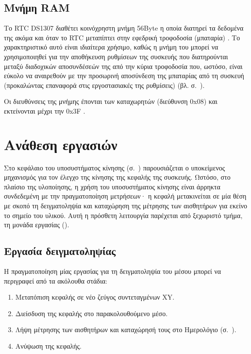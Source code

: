 \subsection{Μνήμη RAM}
\label{subsec:rtc:user-ram}

Το RTC DS1307 διαθέτει κοινόχρηστη μνήμη 56Byte η οποία διατηρεί τα δεδομένα της
ακόμα και όταν το RTC μεταπίπτει στην εφεδρική τροφοδοσία (μπαταρία)
\parencite[1]{ds1307}. Το χαρακτηριστικό αυτό είναι ιδιαίτερα χρήσιμο, καθώς η
μνήμη του μπορεί να χρησιμοποιηθεί για την αποθήκευση ρυθμίσεων της συσκευής που
διατηρούνται μεταξύ διαδοχικών αποσυνδέσεών της από την κύρια τροφοδοσία που,
ωστόσο, είναι εύκολο να αναιρεθούν με την προσωρινή αποσύνδεση της μπαταρίας από
τη συσκευή (προκαλώντας επαναφορά στις εργοστασιακές της ρυθμίσεις) (βλ.
 σ.~\pageref{subsec:backup-memory}).

Οι διευθύνσεις της μνήμης έπονται των καταχωρητών (διεύθυνση 0x08) και
εκτείνονται μέχρι την 0x3F \parencite[8]{ds1307}.



\section{Ανάθεση εργασιών}
\label{sec:task}

Στο κεφάλαιο του υποσυστήματος κίνησης (σ.~\pageref{ch:motor})
παρουσιάζεται ο υποκείμενος μηχανισμός για τον έλεγχο της κίνησης της κεφαλής
της συσκευής.
Ωστόσο, στο πλαίσιο της υλοποίησης, η χρήση του υποσυστήματος κίνησης είναι
άρρηκτα συνδεδεμένη με την πραγματοποίηση μετρήσεων· η κεφαλή μετακινείται σε
μία
θέση με σκοπό τη δειγματοληψία και καταχώρηση της μέτρησης των αισθητήρων για
εκείνο το σημείο του υλικού. Αυτή η πρόσθετη λειτουργία παρέχεται από ξεχωριστό
τμήμα, τη μονάδα εργασίας ().


\subsection{Εργασία δειγματοληψίας}

Η πραγματοποίηση μίας εργασίας για τη δειγματοληψία του μέσου μπορεί να
περιγραφεί από τα ακόλουθα στάδια:
\begin{enumerate}
    \item Μετατόπιση κεφαλής σε νέο ζεύγος συντεταγμένων XY.
    \item Διείσδυση της κεφαλής στο παρακολουθούμενο μέσο.
    \item Λήψη μέτρησης των αισθητήρων και καταχώρησή τους στο Ημερολόγιο
    (σ.~\pageref{sec:log}).
    \item Ανύψωση της κεφαλής.
\end{enumerate}

